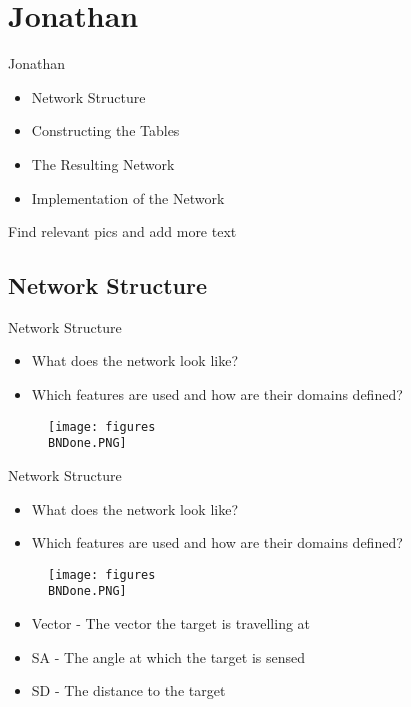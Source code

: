 \section{Jonathan}
\begin{frame}{Jonathan}
\begin{itemize}
\item Network Structure
\item Constructing the Tables
\item The Resulting Network
\item Implementation of the Network
\end{itemize}
Find relevant pics and add more text
\end{frame}

\subsection{Network Structure}
\begin{frame}{Network Structure}
\begin{itemize}
\item What does the network look like?
\item Which features are used and how are their domains defined?
\end{itemize}
\begin{figure}
  \texttt{[image: figures\\BNDone.PNG]}
\end{figure}
\end{frame}

\begin{frame}{Network Structure}
\begin{itemize}
\item What does the network look like?
\item Which features are used and how are their domains defined?
\end{itemize}

\begin{figure}
  \texttt{[image: figures\\BNDone.PNG]}
\end{figure}

\begin{itemize}
  \item Vector - The vector the target is travelling at
  \item SA - The angle at which the target is sensed
  \item SD - The distance to the target
\end{itemize}
\end{frame}

